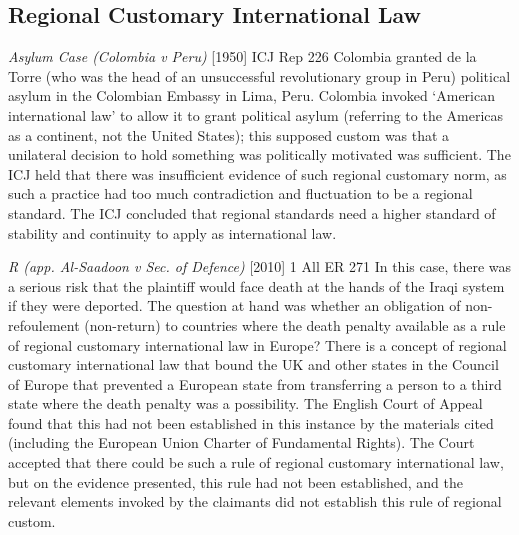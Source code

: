 \subsection{Regional Customary International Law}
\begin{casedetails}{\textit{Asylum Case (Colombia v Peru)} [1950] ICJ Rep 226}
    \flushleft
    Colombia granted de la Torre (who was the head of an unsuccessful revolutionary group in Peru) political asylum in the Colombian Embassy in Lima, Peru. Colombia invoked `American international law' to allow it to grant political asylum (referring to the Americas as a continent, not the United States); this supposed custom was that a unilateral decision to hold something was politically motivated was sufficient. The ICJ held that there was insufficient evidence of such regional customary norm, as such a practice had too much contradiction and fluctuation to be a regional standard. The ICJ concluded that regional standards need a higher standard of stability and continuity to apply as international law.
\end{casedetails}

\begin{casedetails}{\textit{R (app. Al-Saadoon v Sec. of Defence)} [2010] 1 All ER 271}\label{case:R (Al-Saadoon v Sec. of Defence)}
    \flushleft
    In this case, there was a serious risk that the plaintiff would face death at the hands of the Iraqi system if they were deported. The question at hand was whether an obligation of non-refoulement (non-return) to countries where the death penalty available as a rule of regional customary international law in Europe? There is a concept of regional customary international law that bound the UK and other states in the Council of Europe that prevented a European state from transferring a person to a third state where the death penalty was a possibility. The English Court of Appeal found that this had not been established in this instance by the materials cited (including the European Union Charter of Fundamental Rights). The Court accepted that there could be such a rule of regional customary international law, but on the evidence presented, this rule had not been established, and the relevant elements invoked by the claimants did not establish this rule of regional custom.

\end{casedetails}

